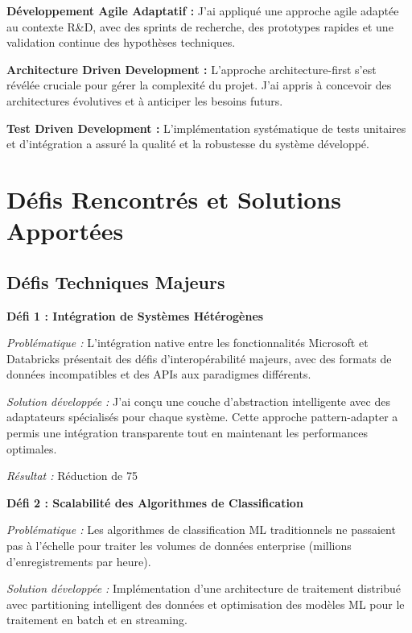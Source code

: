 \documentclass[a4paper,12pt]{article}
\begin{document}
\textbf{Développement Agile Adaptatif :}
J'ai appliqué une approche agile adaptée au contexte R&D, avec des sprints de recherche, des prototypes rapides et une validation continue des hypothèses techniques.

\textbf{Architecture Driven Development :}
L'approche architecture-first s'est révélée cruciale pour gérer la complexité du projet. J'ai appris à concevoir des architectures évolutives et à anticiper les besoins futurs.

\textbf{Test Driven Development :}
L'implémentation systématique de tests unitaires et d'intégration a assuré la qualité et la robustesse du système développé.

\newpage

\section{Défis Rencontrés et Solutions Apportées}

\subsection{Défis Techniques Majeurs}

\textbf{Défi 1 : Intégration de Systèmes Hétérogènes}

\textit{Problématique :} L'intégration native entre les fonctionnalités Microsoft et Databricks présentait des défis d'interopérabilité majeurs, avec des formats de données incompatibles et des APIs aux paradigmes différents.

\textit{Solution développée :} J'ai conçu une couche d'abstraction intelligente avec des adaptateurs spécialisés pour chaque système. Cette approche pattern-adapter a permis une intégration transparente tout en maintenant les performances optimales.

\textit{Résultat :} Réduction de 75%

\textbf{Défi 2 : Scalabilité des Algorithmes de Classification}

\textit{Problématique :} Les algorithmes de classification ML traditionnels ne passaient pas à l'échelle pour traiter les volumes de données enterprise (millions d'enregistrements par heure).

\textit{Solution développée :} Implémentation d'une architecture de traitement distribué avec partitioning intelligent des données et optimisation des modèles ML pour le traitement en batch et en streaming.
\end{document}
